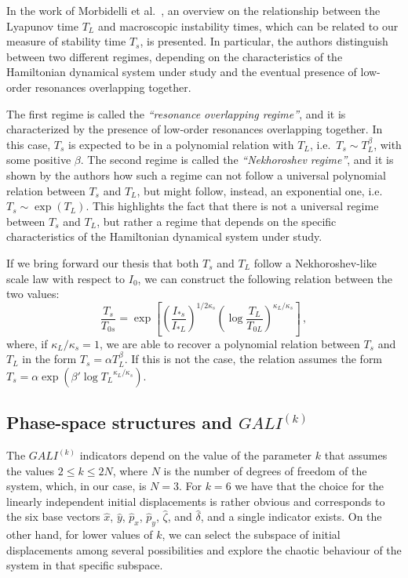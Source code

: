 In the work of Morbidelli et al.~\cite{Morbidelli1995}, an overview on the relationship between the Lyapunov time $T_L$ and macroscopic instability times, which can be related to our measure of stability time $T_s$, is presented. In particular, the authors distinguish between two different regimes, depending on the characteristics of the Hamiltonian dynamical system under study and the eventual presence of low-order resonances overlapping together.

The first regime is called the \textit{``resonance overlapping regime''}, and it is characterized by the presence of low-order resonances overlapping together. In this case, $T_s$ is expected to be in a polynomial relation with $T_L$, i.e.\ $T_s \sim T_L^\beta$, with some positive $\beta$. The second regime is called the \textit{``Nekhoroshev regime''}, and it is shown by the authors how such a regime can not follow a universal polynomial relation between $T_s$ and $T_L$, but might follow, instead, an exponential one, i.e.\ $T_s \sim \exp(T_L)$. This highlights the fact that there is not a universal regime between $T_s$ and $T_L$, but rather a regime that depends on the specific characteristics of the Hamiltonian dynamical system under study.

If we bring forward our thesis that both $T_s$ and $T_L$ follow a Nekhoroshev-like scale law with respect to $I_0$, we can construct the following relation between the two values:
\begin{equation}
    \frac{T_s}{T_{0s}} = \exp\left[\left(\frac{I_{\ast s}}{I_{\ast L}}\right)^{1/2\kappa_s}\left(\log\frac{T_L}{T_{0L}}\right)^{\kappa_L / \kappa_s}\right] \, ,
\end{equation}
where, if $\kappa_L/\kappa_s = 1$, we are able to recover a polynomial relation between $T_s$ and $T_L$ in the form $T_s = \alpha T_L^\beta$. If this is not the case, the relation assumes the form $T_s = \alpha \exp(\beta' \log{T_L}^{\kappa_L / \kappa_s})$.

\subsection{Phase-space structures and $GALI^{(k)}$}

The $GALI^{(k)}$ indicators depend on the value of the parameter $k$ that assumes the values $2 \leq k \leq 2N$, where $N$ is the number of degrees of freedom of the system, which, in our case, is $N=3$. For $k=6$ we have that the choice for the linearly independent initial displacements is rather obvious and corresponds to the six base vectors $\hat{x}$, $\hat{y}$, $\hat{p}_x$, $\hat{p}_y$, $\hat{\zeta}$, and $\hat{\delta}$, and a single indicator exists. On the other hand, for lower values of $k$, we can select the subspace of initial displacements among several possibilities and explore the chaotic behaviour of the system in that specific subspace.

